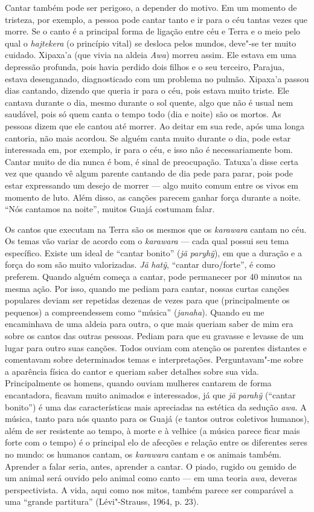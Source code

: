 Cantar também pode ser perigoso, a depender do motivo. Em um momento de
tristeza, por exemplo, a pessoa pode cantar tanto e ir para o céu tantas
vezes que morre. Se o canto é a principal forma de ligação entre céu e
Terra e o meio pelo qual o \emph{hajtekera} (o princípio vital) se
desloca pelos mundos, deve"-se ter muito cuidado. Xipaxa'a (que vivia na
aldeia \emph{Awa}) morreu assim. Ele estava em uma depressão profunda,
pois havia perdido dois filhos e o seu terceiro, Parajua, estava
desenganado, diagnosticado com um problema no pulmão. Xipaxa'a passou
dias cantando, dizendo que queria ir para o céu, pois estava muito
triste. Ele cantava durante o dia, mesmo durante o sol quente, algo que
não é usual nem saudável, pois só quem canta o tempo todo (dia e noite)
são os mortos. As pessoas dizem que ele cantou até morrer. Ao deitar em
sua rede, após uma longa cantoria, não mais acordou. Se alguém canta
muito durante o dia, pode estar interessada em, por exemplo, ir para o
céu, e isso não é necessariamente bom. Cantar muito de dia nunca é bom,
é sinal de preocupação. Tatuxa'a disse certa vez que quando vê algum
parente cantando de dia pede para parar, pois pode estar expressando um
desejo de morrer --- algo muito comum entre os vivos em momento de luto.
Além disso, as canções parecem ganhar força durante a noite. ``Nós
cantamos na noite'', muitos Guajá costumam falar.

Os cantos que executam na Terra são os mesmos que os \emph{karawara}
cantam no céu. Os temas vão variar de acordo com o \emph{karawara} ---
cada qual possui seu tema específico. Existe um ideal de ``cantar bonito''
(\emph{jã} \emph{paryhỹ}), em que a duração e a força do som são muito
valorizadas. \emph{Jã} \emph{hatỹ}, ``cantar duro/forte'', é como
preferem. Quando alguém começa a cantar, pode permanecer por 40 minutos
na mesma ação. Por isso, quando me pediam para cantar, nossas curtas
canções populares deviam ser repetidas dezenas de vezes para que
(principalmente os pequenos) a compreendessem como ``música''
(\emph{janaha}). Quando eu me encaminhava de uma aldeia para outra, o
que mais queriam saber de mim era sobre os cantos das outras pessoas.
Pediam para que eu gravasse e levasse de um lugar para outro suas
canções. Todos ouviam com atenção os parentes distantes e comentavam
sobre determinados temas e interpretações. Perguntavam"-me sobre a
aparência física do cantor e queriam saber detalhes sobre sua vida.
Principalmente os homens, quando ouviam mulheres cantarem de forma
encantadora, ficavam muito animados e interessados, já que \emph{jã}
\emph{parahỹ} (``cantar bonito'') é uma das características mais
apreciadas na estética da sedução \emph{awa}. A música, tanto para nós
quanto para os Guajá (e tantos outros coletivos humanos), além de ser
resistente ao tempo, à morte e à velhice (a música parece ficar mais
forte com o tempo) é o principal elo de afecções e relação entre os
diferentes seres no mundo: os humanos cantam, os \emph{karawara} cantam
e os animais também. Aprender a falar seria, antes, aprender a cantar. O
piado, rugido ou gemido de um animal será ouvido pelo animal como canto
--- em uma teoria \emph{awa}, deveras perspectivista. A vida, aqui como
nos mitos, também parece ser comparável a uma ``grande partitura''
(Lévi"-Strauss, 1964, p. 23).

